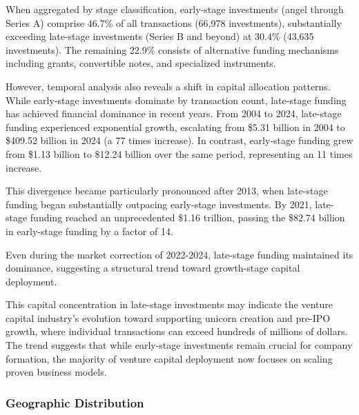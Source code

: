 When aggregated by stage classification, early-stage investments (angel through Series A) comprise 46.7\% of all transactions (66,978 investments), substantially exceeding late-stage investments (Series B and beyond) at 30.4\% (43,635 investments). The remaining 22.9\% consists of alternative funding mechanisms including grants, convertible notes, and specialized instruments.

However, temporal analysis also reveals a shift in capital allocation patterns. While early-stage investments dominate by transaction count, late-stage funding has achieved financial dominance in recent years. From 2004 to 2024, late-stage funding experienced exponential growth, escalating from \$5.31 billion in 2004 to \$409.52 billion in 2024 (a 77 times increase). In contrast, early-stage funding grew from \$1.13 billion to \$12.24 billion over the same period, representing an 11 times increase.

This divergence became particularly pronounced after 2013, when late-stage funding began substantially outpacing early-stage investments. By 2021, late-stage funding reached an unprecedented \$1.16 trillion, passing the \$82.74 billion in early-stage funding by a factor of 14. 

Even during the market correction of 2022-2024, late-stage funding maintained its dominance, suggesting a structural trend toward growth-stage capital deployment.


This capital concentration in late-stage investments may indicate the venture capital industry's evolution toward supporting unicorn creation and pre-IPO growth, where individual transactions can exceed hundreds of millions of dollars. The trend suggests that while early-stage investments remain crucial for company formation, the majority of venture capital deployment now focuses on scaling proven business models.


\subsubsection{Geographic Distribution}

